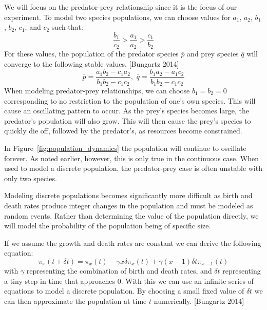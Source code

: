     We will focus on the predator-prey relationship since it is the focus of
    our experiment.
    To model two species populations, we can choose values for
    $a_1$, $a_2$, $b_1$, $b_2$, $c_1$, and $c_2$ such that:
    \begin{equation}\label{eq:inequality}
        \displaystyle \frac{b_1}{c_2} > \frac{a_1}{a_2} > \frac{c_1}{b_2}
    \end{equation}
    For these values, the population of the predator species $\overline{p}$ and
    prey species $\overline{q}$ will converge to the following stable values. [Bungartz 2014]
    \begin{equation}\label{eq:convergence}
        \displaystyle \overline{p} = \frac{a_1 b_2 - c_1 a_2}{b_1 b_2 - c_1 c_2}, \,\,
                      \overline{q} = \frac{b_1 a_2 - a_1 c_2}{b_1 b_2 - c_1 c_2}
    \end{equation}
    When modeling predator-prey relationships, we can choose
    $b_1 = b_2 = 0$ corresponding to no restriction to the population
    of one's own species.
    This will cause an oscillating pattern to occur.
    As the prey's species becomes large, the predator's population will also grow.
    This will then cause the prey's species to quickly die off,
    followed by the predator's, as resources become constrained.

    In Figure~\ref{fig:population_dynamics} the population will continue to oscillate forever.
    As noted earlier, however, this is only true in the continuous case.
    When used to model a discrete population, the predator-prey case is often
    unstable with only two species.

    Modeling discrete populations becomes significantly more difficult as birth
    and death rates produce integer changes in the population and must be modeled
    as random events.
    Rather than determining the value of the population directly, we will model
    the probability of the population being of specific size.

    If we assume the growth and death rates are constant we can derive the
    following equation:
    \begin{equation}\label{eq:discrete_population}
        \pi_x(t + \delta t) =
        \pi_x(t) - \gamma x \delta \pi_x(t) + \gamma(x - 1)\delta t \pi_{x - 1}(t)
    \end{equation}
    with $\gamma$ representing the combination of birth and death rates,
    and $\delta t$ representing a tiny step in time that approaches $0$.
    With this we can use an infinite series of equations to model a
    discrete population.
    By choosing a small fixed value of $\delta t$ we can then approximate
    the population at time $t$ numerically. [Bungartz 2014]

